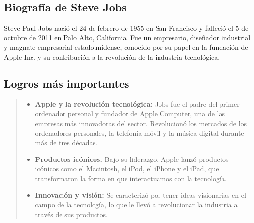 \documentclass[11pt,twoside]{book}
\begin{document}
\subsection{Biografía de Steve Jobs}

Steve Paul Jobs nació el 24 de febrero de 1955 en San Francisco y falleció el 5 de octubre de 2011 en Palo Alto, California. Fue un empresario, diseñador industrial y magnate empresarial estadounidense, conocido por su papel en la fundación de Apple Inc. y su contribución a la revolución de la industria tecnológica.

\subsection*{Logros más importantes}

\begin{quote}
\begin{itemize}
    \item \textbf{Apple y la revolución tecnológica:} Jobs fue el padre del primer ordenador personal y fundador de Apple Computer, una de las empresas más innovadoras del sector. Revolucionó los mercados de los ordenadores personales, la telefonía móvil y la música digital durante más de tres décadas.
    
    \item \textbf{Productos icónicos:} Bajo su liderazgo, Apple lanzó productos icónicos como el Macintosh, el iPod, el iPhone y el iPad, que transformaron la forma en que interactuamos con la tecnología.
    
    \item \textbf{Innovación y visión:} Se caracterizó por tener ideas visionarias en el campo de la tecnología, lo que le llevó a revolucionar la industria a través de sus productos.
\end{itemize}
\end{quote}
\end{document}
